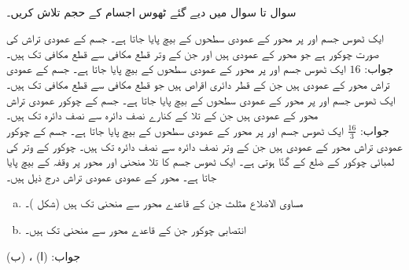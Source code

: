\\
سوال  تا سوال  میں دیے گئے ٹھوس اجسام کے حجم تلاش کریں۔

ایک ٹھوس جسم  اور  پر   محور کے عمودی سطحوں کے بیچ پایا جاتا ہے۔ جسم کے عمودی تراش کی صورت چوکور ہے جو   محور کے عمودی ہیں اور جن کے وتر قطع مکافی  سے قطع مکافی  تک ہیں۔\\
جواب:\quad
$16$
ایک ٹھوس جسم  اور  پر   محور کے عمودی سطحوں کے بیچ پایا جاتا ہے۔ جسم کے عمودی تراش  محور کے عمودی ہیں جن کے قطر دائری اقراص ہیں جو قطع مکافی  سے قطع مکافی  تک ہیں۔   
ایک ٹھوس جسم  اور  پر   محور کے عمودی سطحوں کے بیچ پایا جاتا ہے۔ جسم کے چوکور عمودی تراش  محور کے عمودی ہیں جن کے تلا کے کنارے نصف دائرہ  سے نصف دائرہ  تک ہیں۔ \\
جواب:\quad
$\tfrac{16}{3}$  
ایک ٹھوس جسم  اور  پر   محور کے عمودی سطحوں کے بیچ پایا جاتا ہے۔ جسم کے چوکور عمودی تراش  محور کے عمودی ہیں جن کے وتر نصف دائرہ  سے نصف دائرہ  تک ہیں۔ چوکور کے وتر کی لمبائی چوکور کے ضلع کے  گنّا ہوتی ہے۔
ایک ٹھوس جسم کا تلا منحنی  اور  محور پر وقفہ   کے بیچ پایا جاتا ہے۔  محور کے عمودی عمودی تراش درج ذیل ہیں۔
\begin{enumerate}[a.]
\item
مساوی الاضلاع  مثلث جن کے قاعدے  محور سے منحنی تک ہیں (شکل )۔
\item
انتصابی چوکور جن کے قاعدے  محور سے منحنی تک ہیں۔
\end{enumerate}
جواب:\quad
(ا) ، (ب) 

